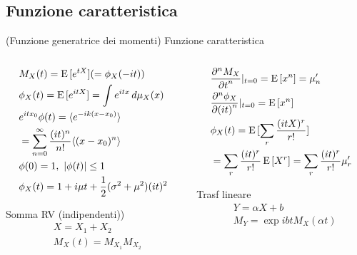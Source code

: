 \documentclass[asd-beamer.tex]{subfiles}%
\begin{document}
\subsection{Funzione caratteristica}

\begin{frame}{(Funzione generatrice dei momenti) Funzione caratteristica}
\begin{columns}[T]
	\begin{column}{0.5\textwidth}
		\begin{align*}
		&M_X(t)=\E{[\exp{tX}]}(=\phi_X(-it))\\
		&\phi_X(t)=\E{[\exp{itX}]}=\int\exp{itx}\,d\mu_X(x)\\
		&\exp{itx_0}\phi(t)=\exv{\exp{-ik(x-x_0)}}\\
		&=\sum_{n=0}^{\infty}\frac{(it)^n}{n!}\exv{(x-x_0)^n}\\
		&\phi(0)=1,\ |\phi(t)|\leq1\\
		&\phi_X(t)=1+i\mu t+\frac{1}{2}(\sigma^2+\mu^2)(it)^2
		\end{align*}
		\begin{block}{Somma RV (indipendenti))}
			\begin{align*}
			&X=X_1+X_2\\
			&M_X(t)=M_{X_1}M_{X_2}
			\end{align*}
		\end{block}
	\end{column}
	\begin{column}{0.5\textwidth}
		\begin{align*}
		&\PDyn{t}{M_X}{n}|_{t=0}=\E{[x^n]}=\mu_n'\\
		&\PDyn{(it)}{\phi_X}{n}|_{t=0}=\E{[x^n]}\\
		&\phi_X(t)=\E{[\sum_r\frac{(itX)^r}{r!}]}\\
		&=\sum_r\frac{(it)^r}{r!}\E{[X^r]}=\sum_r\frac{(it)^r}{r!}\mu_r'
		\end{align*}
		\begin{block}{}\end{block}
		\begin{block}{Trasf lineare}
			\begin{align*}
			&Y=\alpha X+b\\
			&M_Y=\exp{ibt}M_X(\alpha t)
			\end{align*}
		\end{block}
	\end{column}
\end{columns}
\end{frame}
\end{document}
